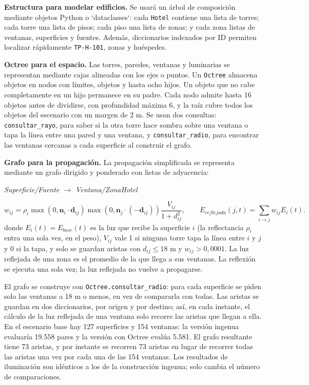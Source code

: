 \documentclass[12pt,a4paper]{article}
\newcommand{\clase}[1]{\texttt{#1}}
\newcommand{\codigo}[1]{\texttt{#1}}
\begin{document}
\textbf{Estructura para modelar edificios.} Se usará un árbol de composición mediante objetos Python o `dataclasses`: cada \clase{Hotel} contiene una lista de torres; cada torre una lista de pisos; cada piso una lista de zonas; y cada zona listas de ventanas, superficies y fuentes. Además, diccionarios indexados por ID permiten localizar rápidamente \codigo{TP-H-101}, zonas y huéspedes.

\textbf{Octree para el espacio.} Las torres, paredes, ventanas y luminarias se representan mediante cajas alineadas con los ejes o puntos. Un \clase{Octree} almacena objetos en nodos con límites, objetos y hasta ocho hijos. Un objeto que no cabe completamente en un hijo permanece en su padre. Cada nodo admite hasta 16 objetos antes de dividirse, con profundidad máxima 6, y la raíz cubre todos los objetos del escenario con un margen de 2 m. Se usan dos consultas: \codigo{consultar\_rayo}, para saber si la otra torre hace sombra sobre una ventana o tapa la línea entre una pared y una ventana, y \codigo{consultar\_radio}, para encontrar las ventanas cercanas a cada superficie al construir el grafo.

\textbf{Grafo para la propagación.} La propagación simplificada se representa mediante un grafo dirigido y ponderado con listas de adyacencia:
\begin{center}\textit{Superficie/Fuente $\longrightarrow$ Ventana/ZonaHotel}\end{center}
\begin{equation}
 w_{ij}=\rho_i\max(0,\mathbf n_i\cdot\mathbf d_{ij})\max(0,\mathbf n_j\cdot(-\mathbf d_{ij}))\frac{V_{ij}}{1+d_{ij}^{2}},\qquad
 E_{reflejada}(j,t)=\sum_{i\rightarrow j}w_{ij}E_i(t).
 \label{eq:influencia}
\end{equation}
donde $E_i(t)=E_{base}(t)$ es la luz que recibe la superficie $i$ (la reflectancia $\rho_i$ entra una sola vez, en el peso), $V_{ij}$ vale 1 si ninguna torre tapa la línea entre $i$ y $j$ y 0 si la tapa, y solo se guardan aristas con $d_{ij}\leq18$ m y $w_{ij}>0,0001$. La luz reflejada de una zona es el promedio de la que llega a sus ventanas. La reflexión se ejecuta una sola vez; la luz reflejada no vuelve a propagarse.

El grafo se construye con \codigo{Octree.consultar\_radio}: para cada superficie se piden solo las ventanas a 18 m o menos, en vez de compararla con todas. Las aristas se guardan en dos diccionarios, por origen y por destino; así, en cada instante, el cálculo de la luz reflejada de una ventana solo recorre las aristas que llegan a ella. En el escenario base hay 127 superficies y 154 ventanas: la versión ingenua evaluaría 19.558 pares y la versión con Octree evalúa 5.581. El grafo resultante tiene 73 aristas, y por instante se recorren 73 aristas en lugar de recorrer todas las aristas una vez por cada una de las 154 ventanas. Los resultados de iluminación son idénticos a los de la construcción ingenua; solo cambia el número de comparaciones.
\end{document}

